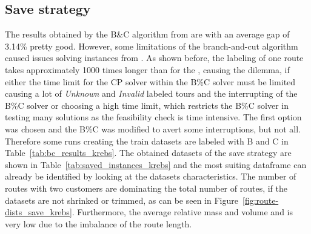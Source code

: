 \subsection{Save strategy}
\label{subsec:challenges_krebs_save}

The results obtained by the B\&C algorithm from \cite{tamke_branch-and-cut_2024} are with an average gap of 3.14\% pretty good. However, some limitations
of the branch-and-cut algorithm caused issues solving instances from \krebsADataSetText. As shown before, the labeling of one route takes approximately
1000 times longer than for the \gendreauDataSetText, causing the dilemma, if either the time limit for the \gls{CP} solver within the B\%C solver
must be limited causing a lot of \textit{Unknown} and \textit{Invalid} labeled tours and the interrupting of the B\%C solver or choosing
a high time limit, which restricts the B\%C solver in testing many solutions as the feasibility check is time intensive. The first option
was chosen and the B\%C was modified to avert some interruptions, but not all. Therefore some runs creating the train datasets are labeled with
B and C in Table~\ref{tab:bc_results_krebs}. The obtained datasets of the save strategy are shown in Table~\ref{tab:saved_instances_krebs}
and the most suiting dataframe can already be identified by looking at the datasets characteristics. The number of routes with two customers
are dominating the total number of routes, if the datasets are not shrinked or trimmed, as can be seen in Figure~\ref{fig:route-dists_save_krebs}. Furthermore, the average relative mass and volume and
is very low due to the imbalance of the route length.

